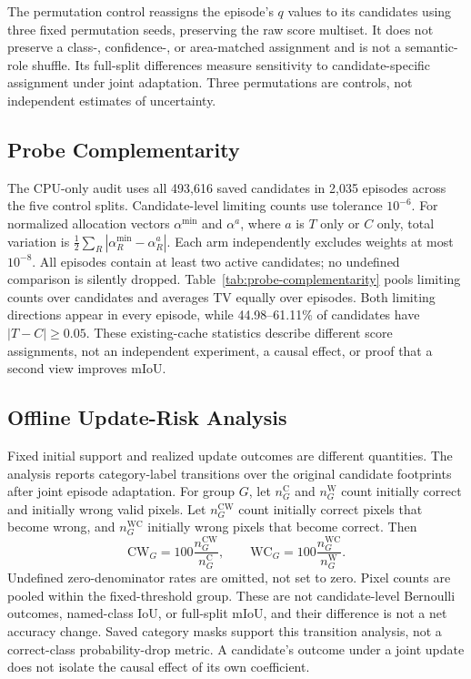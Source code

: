 The permutation control reassigns the episode's $q$ values to its candidates using three fixed permutation seeds, preserving the raw score multiset. It does not preserve a class-, confidence-, or area-matched assignment and is not a semantic-role shuffle. Its full-split differences measure sensitivity to candidate-specific assignment under joint adaptation. Three permutations are controls, not independent estimates of uncertainty.

\subsection{Probe Complementarity}
The CPU-only audit uses all 493,616 saved candidates in 2,035 episodes across the five control splits. Candidate-level limiting counts use tolerance $10^{-6}$. For normalized allocation vectors $\alpha^{\min}$ and $\alpha^a$, where $a$ is $T$ only or $C$ only, total variation is $\tfrac12\sum_R|\alpha_R^{\min}-\alpha_R^a|$. Each arm independently excludes weights at most $10^{-8}$. All episodes contain at least two active candidates; no undefined comparison is silently dropped. Table~\ref{tab:probe-complementarity} pools limiting counts over candidates and averages TV equally over episodes. Both limiting directions appear in every episode, while 44.98--61.11\% of candidates have $|T-C|\geq0.05$. These existing-cache statistics describe different score assignments, not an independent experiment, a causal effect, or proof that a second view improves mIoU.



\subsection{Offline Update-Risk Analysis}
Fixed initial support and realized update outcomes are different quantities. The analysis reports category-label transitions over the original candidate footprints after joint episode adaptation. For group $G$, let $n_G^{\mathrm C}$ and $n_G^{\mathrm W}$ count initially correct and initially wrong valid pixels. Let $n_G^{\mathrm{CW}}$ count initially correct pixels that become wrong, and $n_G^{\mathrm{WC}}$ initially wrong pixels that become correct. Then
\begin{equation}
\mathrm{CW}_G=100\frac{n_G^{\mathrm{CW}}}{n_G^{\mathrm C}},\qquad
\mathrm{WC}_G=100\frac{n_G^{\mathrm{WC}}}{n_G^{\mathrm W}}.
\end{equation}
Undefined zero-denominator rates are omitted, not set to zero. Pixel counts are pooled within the fixed-threshold group. These are not candidate-level Bernoulli outcomes, named-class IoU, or full-split mIoU, and their difference is not a net accuracy change. Saved category masks support this transition analysis, not a correct-class probability-drop metric. A candidate's outcome under a joint update does not isolate the causal effect of its own coefficient.

